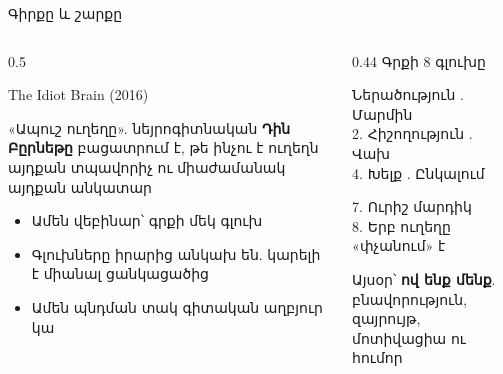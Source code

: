\begin{frame}{Գիրքը և շարքը}
  \begin{columns}[T]
    \begin{column}{0.5\textwidth}
      \begin{card}
        {\blackfont\Large The Idiot Brain} {\small (2016)}\par
        «Ապուշ ուղեղը». նեյրոգիտնական \textbf{Դին Բըրնեթը} բացատրում է, թե ինչու է ուղեղն այդքան տպավորիչ ու միաժամանակ այդքան անկատար\par\medskip
        \begin{itemize}
          \item Ամեն վեբինար՝ գրքի մեկ գլուխ
          \item Գլուխները իրարից անկախ են. կարելի է միանալ ցանկացածից
          \item Ամեն պնդման տակ գիտական աղբյուր կա
        \end{itemize}
      \end{card}
    \end{column}
    \begin{column}{0.44\textwidth}
      {\blackfont\small Գրքի 8 գլուխը}\par\smallskip
      {\color{plum!55!cream}\small
      Ներածություն . Մարմին\\
      2. Հիշողություն . Վախ\\
      4. Խելք . Ընկալում}\par\smallskip
      \par\smallskip
      {\color{plum!55!cream}\small
      7. Ուրիշ մարդիկ\\
      8. Երբ ուղեղը «փչանում» է}\par\medskip
      \begin{card}[left=1.3mm, right=1.3mm, colback=lavender!35!cardwhite]
        Այսօր՝ \textbf{ով ենք մենք}. բնավորություն, զայրույթ, մոտիվացիա ու հումոր
      \end{card}
    \end{column}
  \end{columns}
\end{frame}

